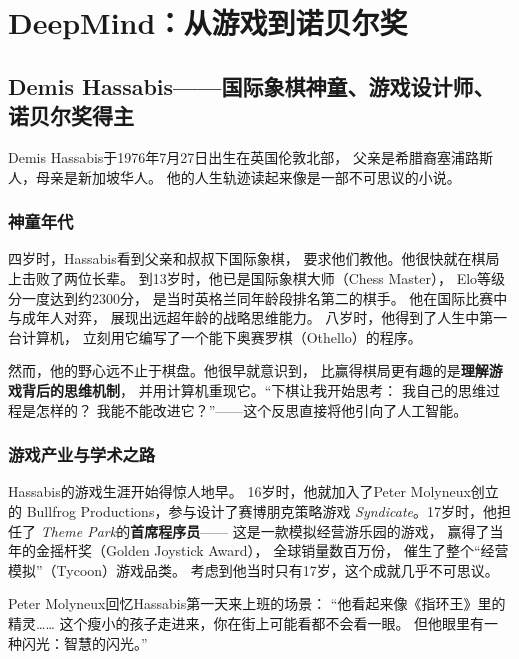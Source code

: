 \section{DeepMind：从游戏到诺贝尔奖}
\label{sec:deepmind}

\subsection{Demis Hassabis——国际象棋神童、游戏设计师、诺贝尔奖得主}
\label{sec:hassabis}

Demis Hassabis于1976年7月27日出生在英国伦敦北部，
父亲是希腊裔塞浦路斯人，母亲是新加坡华人。
他的人生轨迹读起来像是一部不可思议的小说。

\subsubsection{神童年代}
四岁时，Hassabis看到父亲和叔叔下国际象棋，
要求他们教他。他很快就在棋局上击败了两位长辈。
到13岁时，他已是国际象棋大师（Chess Master），
Elo等级分一度达到约2300分，
是当时英格兰同年龄段排名第二的棋手。
他在国际比赛中与成年人对弈，
展现出远超年龄的战略思维能力。
八岁时，他得到了人生中第一台计算机，
立刻用它编写了一个能下奥赛罗棋（Othello）的程序。

然而，他的野心远不止于棋盘。他很早就意识到，
比赢得棋局更有趣的是\textbf{理解游戏背后的思维机制}，
并用计算机重现它。``下棋让我开始思考：
我自己的思维过程是怎样的？
我能不能改进它？''——这个反思直接将他引向了人工智能。

\subsubsection{游戏产业与学术之路}
Hassabis的游戏生涯开始得惊人地早。
16岁时，他就加入了Peter Molyneux创立的
Bullfrog Productions，参与设计了赛博朋克策略游戏
\textit{Syndicate}。17岁时，他担任了
\textit{Theme Park}的\textbf{首席程序员}——
这是一款模拟经营游乐园的游戏，
赢得了当年的金摇杆奖（Golden Joystick Award），
全球销量数百万份，
催生了整个``经营模拟''（Tycoon）游戏品类。
考虑到他当时只有17岁，这个成就几乎不可思议。

Peter Molyneux回忆Hassabis第一天来上班的场景：
``他看起来像《指环王》里的精灵……
这个瘦小的孩子走进来，你在街上可能看都不会看一眼。
但他眼里有一种闪光：智慧的闪光。''

